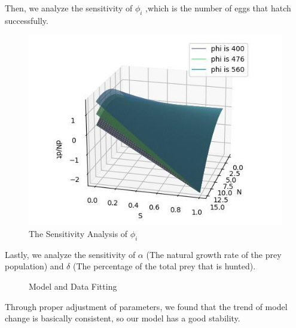 \documentclass[12pt]{article}  %
\begin{document}
Then, we analyze the sensitivity of $\phi_{i}$ ,which is the number of eggs that hatch successfully.
\vspace{-0.5cm}
\begin{figure}[H]  %
	\centering  %
	\includegraphics[width=.6\textwidth]{灵敏度分析1 (3).jpg} %
	\caption{The Sensitivity Analysis of $\phi_{i}$}
\end{figure}
\vspace{-0.6cm}
Lastly, we analyze the sensitivity of $\alpha$ (The natural growth rate of the prey population) and $\delta$ (The percentage of the total prey that is hunted).
\vspace{-0.3cm}
\begin{figure}[H]
	\centering    
	
	\caption{Model and Data Fitting} %
\end{figure}
\vspace{-0.7cm}
Through proper adjustment of parameters, we found that the trend of model change is basically consistent, so our model has a good stability.
\end{document}
